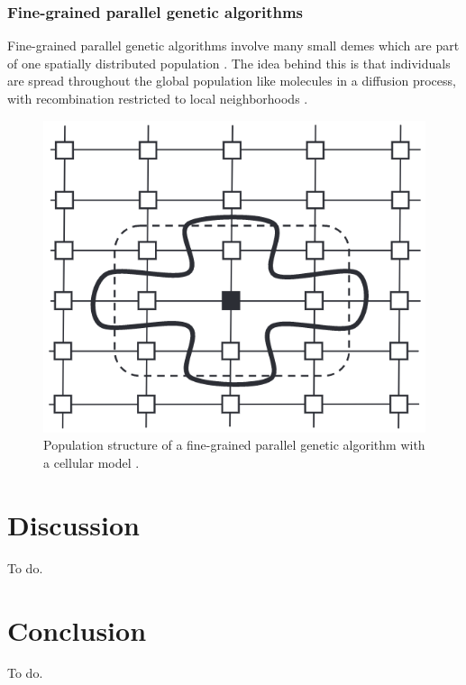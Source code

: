 \documentclass[sigconf]{acmart}
\begin{document}
\subsubsection*{Fine-grained parallel genetic algorithms}
Fine-grained parallel genetic algorithms involve many small demes which are
part of one spatially distributed population \cite{Affenzeller2009}.
The idea behind this is that individuals are spread throughout the
global population like molecules in a diffusion process, with recombination
restricted to local neighborhoods \cite{Affenzeller2009}.
\begin{figure}[h]
  \includegraphics[scale=0.24]{assets/parallel-ga-fine.png}
  \caption{
    Population structure of a fine-grained parallel genetic algorithm
    with a cellular model \cite{Affenzeller2009}.
  }
\end{figure}


\section{Discussion}
To do.

\section{Conclusion}
To do.
\end{document}
